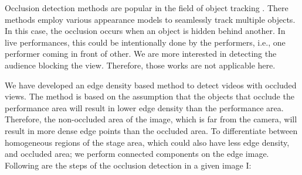 \documentclass{new}
\begin{document}
Occlusion detection methods are popular in the field of object
tracking \cite{rfc13,rfc19}. There methods employ various appearance models
to seamlessly track multiple objects. In this case, the occlusion
occurs when an object is hidden behind another. In live performances,
this could be intentionally done by the performers, i.e.,
one performer coming in front of other. We are more interested in
detecting the audience blocking the view. Therefore, those works
are not applicable here.

We have developed an edge density based method to detect videos
with occluded views. The method is based on the assumption that
the objects that occlude the performance area will result in lower
edge density than the performance area. Therefore, the non-occluded
area of the image, which is far from the camera, will result in more
dense edge points than the occluded area. To differentiate between
homogeneous regions of the stage area, which could also have less edge density, and occluded area; we perform connected components
on the edge image. Following are the steps of the occlusion
detection in a given image I:
\end{document}
